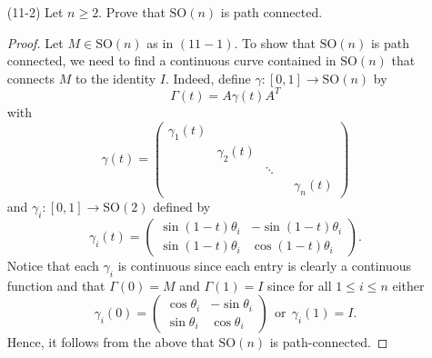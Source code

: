 \documentclass{article}
\begin{document}
\begin{enumerate}
\begin{proof}
\begin{align*}
                                &= \begin{pmatrix} \cos^{2} \theta + \sin^{2} \theta & 0 \\ 0 & \cos^{2}\theta + \sin^{2} \theta \end{pmatrix}  \\
                                &= \begin{pmatrix} 1 & 0 \\ 0 & 1  \end{pmatrix} \\
                                &= I.
        \end{align*}
        Hence, for all \( 1 \leq i \leq n  \), \( {M}_{i}^{T} {M}_{i} = I  \) and so \( M^{T} M = I  \). Thus, \( M^{T}M = I  \) and \( \text{det} M = 1   \). Thus, \( M \in \text{SO}(n)  \).
    \end{proof}
    \item[(11-2)] Let \( n \geq 2  \). Prove that \(\text{SO}(n)  \) is path connected.
        \begin{proof}
            Let \( M \in \text{SO}(n)   \) as in \( (11-1) \). To show that \( \text{SO}(n)   \) is path connected, we need to find a continuous curve contained in \( \text{SO}(n)  \) that connects \( M  \) to the identity \( I  \). Indeed, define \( \gamma: [0,1] \to \text{SO}(n)  \) by
            \[  \Gamma(t) = A \gamma(t) A^{T} \]
            with 
            \[  \gamma(t) = \begin{pmatrix} {\gamma}_{1}(t) &  & \\ & {\gamma}_{2}(t) & &  \\  & & \ddots  &  \\ & & & & {\gamma}_{n}(t) \end{pmatrix}  \]
            and \( {\gamma}_{i}: [0,1] \to \text{SO}(2)   \) defined by
            \[  {\gamma}_{i}(t) = \begin{pmatrix} \sin (1-t){\theta}_{i} & - \sin (1-t) {\theta}_{i} \\ \sin (1-t) {\theta}_{i} & \cos  (1-t) {\theta}_{i} \end{pmatrix}.  \tag{\( 1 \leq i \leq n  \)} \]
            Notice that each \( {\gamma}_{i}  \) is continuous since each entry is clearly a continuous function and that \( \Gamma(0) = M  \) and \( \Gamma(1) = I  \) since for all \( 1 \leq i \leq n  \) either
            \[  {\gamma}_{i}(0) = \begin{pmatrix} \cos {\theta}_{i} & - \sin {\theta}_{i} \\ \sin {\theta}_{i} & \cos {\theta}_{i}  \end{pmatrix} \ \ \text{or} \ \ {\gamma}_{i}(1) = I.   \]
            Hence, it follows from the above that \( \text{SO}(n)   \) is path-connected.
        \end{proof} 
\end{enumerate}
\end{document}
